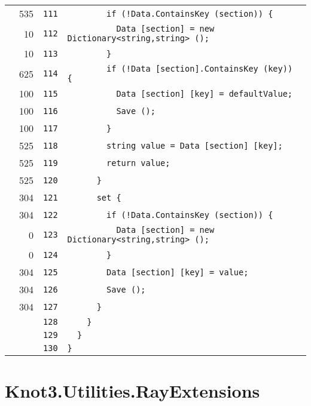 \documentclass[a4paper,10pt]{article}
\begin{document}
\begin{longtable}[l]{lrrl}
\cellcolor{green} & 535 & \verb~111~ & \verb~        if (!Data.ContainsKey (section)) {~\\
\cellcolor{green} & 10 & \verb~112~ & \verb~          Data [section] = new Dictionary<string,string> ();~\\
\cellcolor{green} & 10 & \verb~113~ & \verb~        }~\\
\cellcolor{green} & 625 & \verb~114~ & \verb~        if (!Data [section].ContainsKey (key)) {~\\
\cellcolor{green} & 100 & \verb~115~ & \verb~          Data [section] [key] = defaultValue;~\\
\cellcolor{green} & 100 & \verb~116~ & \verb~          Save ();~\\
\cellcolor{green} & 100 & \verb~117~ & \verb~        }~\\
\cellcolor{green} & 525 & \verb~118~ & \verb~        string value = Data [section] [key];~\\
\cellcolor{green} & 525 & \verb~119~ & \verb~        return value;~\\
\cellcolor{green} & 525 & \verb~120~ & \verb~      }~\\
\cellcolor{green} & 304 & \verb~121~ & \verb~      set {~\\
\cellcolor{green} & 304 & \verb~122~ & \verb~        if (!Data.ContainsKey (section)) {~\\
\cellcolor{red} & 0 & \verb~123~ & \verb~          Data [section] = new Dictionary<string,string> ();~\\
\cellcolor{red} & 0 & \verb~124~ & \verb~        }~\\
\cellcolor{green} & 304 & \verb~125~ & \verb~        Data [section] [key] = value;~\\
\cellcolor{green} & 304 & \verb~126~ & \verb~        Save ();~\\
\cellcolor{green} & 304 & \verb~127~ & \verb~      }~\\
\cellcolor{gray} &  & \verb~128~ & \verb~    }~\\
\cellcolor{gray} &  & \verb~129~ & \verb~  }~\\
\cellcolor{gray} &  & \verb~130~ & \verb~}~\\
\end{longtable}
\newpage
\section{Knot3.Utilities.RayExtensions}
\end{document}
